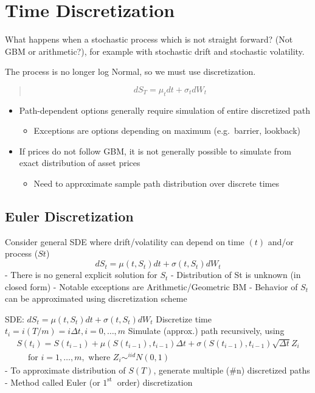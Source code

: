 \documentclass[
  oneside]{book}
\providecommand{\tightlist}{%
  \setlength{\itemsep}{0pt}\setlength{\parskip}{0pt}}
\begin{document}
\hypertarget{time-discretization}{%
\section{Time Discretization}\label{time-discretization}}

What happens when a stochastic process which is not straight forward? (Not GBM or arithmetic?), for example with stochastic drift and stochastic volatility.

The process is no longer log Normal, so we must use discretization.

\begin{quote}
\[
dS_{T} = \mu_{t}dt + \sigma_{t}dW_{t}
\]
\end{quote}

\begin{itemize}
\tightlist
\item
  Path-dependent options generally require simulation of entire discretized path

  \begin{itemize}
  \tightlist
  \item
    Exceptions are options depending on maximum (e.g.~barrier, lookback)
  \end{itemize}
\item
  If prices do not follow GBM, it is not generally possible to simulate from exact distribution of asset prices

  \begin{itemize}
  \tightlist
  \item
    Need to approximate sample path distribution over discrete times
  \end{itemize}
\end{itemize}

\hypertarget{euler-discretization}{%
\subsection{Euler Discretization}\label{euler-discretization}}

Consider general SDE where drift/volatility can depend on time \((t)\) and/or process (\(St\))
\[
d S_t=\mu\left(t, S_t\right) d t+\sigma\left(t, S_t\right) d W_t
\]
- There is no general explicit solution for \(S_{t}\)
- Distribution of St is unknown (in closed form)
- Notable exceptions are Arithmetic/Geometric BM
- Behavior of \(S_{t}\) can be approximated using discretization scheme

SDE: \(d S_t=\mu\left(t, S_t\right) d t+\sigma\left(t, S_t\right) d W_t\)
Discretize time \(t_i=i(T / m)=i \Delta t, i=0, \ldots, m\)
Simulate (approx.) path recursively, using
\[
\begin{gathered}
S\left(t_i\right)=S\left(t_{i-1}\right)+\mu\left(S\left(t_{i-1}\right), t_{i-1}\right) \Delta t+\sigma\left(S\left(t_{i-1}\right), t_{i-1}\right) \sqrt{\Delta t} Z_i \\
\quad \text { for } i=1, \ldots, m, \text { where } Z_i \sim^{i i d} N(0,1)
\end{gathered}
\]
- To approximate distribution of \(S(T)\), generate multiple (\#n) discretized paths
- Method called Euler (or \(1^{\text {st }}\) order) discretization
\end{document}
